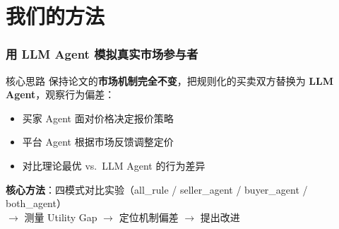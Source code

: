 \documentclass[10pt,aspectratio=169]{beamer}
\begin{document}
\section{我们的方法}

\begin{frame}
	\frametitle{用 LLM Agent 模拟真实市场参与者}

	\begin{block}{核心思路}
		保持论文的\textbf{市场机制完全不变}，把规则化的买卖双方替换为 \textbf{LLM Agent}，观察行为偏差：
		\begin{itemize}
			\item 买家 Agent 面对价格决定报价策略
			\item 平台 Agent 根据市场反馈调整定价
			\item 对比理论最优 vs.\ LLM Agent 的行为差异
		\end{itemize}
	\end{block}

	\vspace{0.3cm}
	\begin{center}
		\textbf{核心方法}：四模式对比实验（all\_rule / seller\_agent / buyer\_agent / both\_agent）\\
		$\rightarrow$ 测量 Utility Gap $\rightarrow$ 定位机制偏差 $\rightarrow$ 提出改进
	\end{center}
\end{frame}
\end{document}
